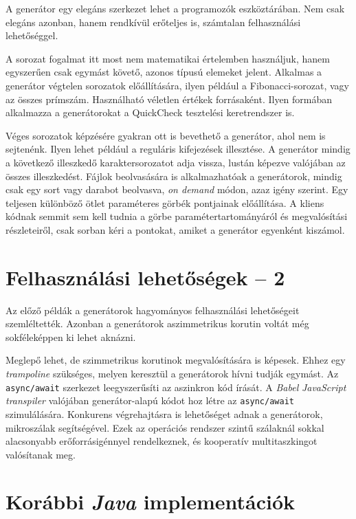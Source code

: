 \documentclass[12pt, a4paper]{article}
\begin{document}
A generátor egy elegáns szerkezet lehet a programozók eszköztárában. Nem csak elegáns azonban, hanem rendkívül erőteljes is, számtalan felhasználási lehetőséggel.

A sorozat fogalmat itt most nem matematikai értelemben használjuk, hanem egyszerűen csak egymást követő, azonos típusú elemeket jelent. Alkalmas a generátor végtelen sorozatok előállítására, ilyen például a Fibonacci-sorozat, vagy az összes prímszám. Használható véletlen értékek forrásaként. Ilyen formában alkalmazza a generátorokat a QuickCheck tesztelési keretrendszer is.

Véges sorozatok képzésére gyakran ott is bevethető a generátor, ahol nem is sejtenénk. Ilyen lehet például a reguláris kifejezések illesztése. A generátor mindig a következő illeszkedő karaktersorozatot adja vissza, lustán képezve valójában az összes illeszkedést. Fájlok beolvasására is alkalmazhatóak a generátorok, mindig csak egy sort vagy darabot beolvasva, \textit{on demand} módon, azaz igény szerint. Egy teljesen különböző ötlet paraméteres görbék pontjainak előállítása. A kliens kódnak semmit sem kell tudnia a görbe paramétertartományáról és megvalósítási részleteiről, csak sorban kéri a pontokat, amiket a generátor egyenként kiszámol.

\section{Felhasználási lehetőségek -- 2}

Az előző példák a generátorok hagyományos felhasználási lehetőségeit szemléltették. Azonban a generátorok aszimmetrikus korutin voltát még sokféleképpen ki lehet aknázni.

Meglepő lehet, de szimmetrikus korutinok megvalósítására is képesek. Ehhez egy \textit{trampoline} szükséges, melyen keresztül a generátorok hívni tudják egymást. Az \texttt{async/await} szerkezet leegyszerűsíti az aszinkron kód írását. A \textit{Babel} \textit{JavaScript} \textit{transpiler} valójában generátor-alapú kódot hoz létre az \texttt{async/await} szimulálására. Konkurens végrehajtásra is lehetőséget adnak a generátorok, mikroszálak segítségével. Ezek az operációs rendszer szintű szálaknál sokkal alacsonyabb erőforrásigénnyel rendelkeznek, és kooperatív multitaszkingot valósítanak meg.

\section{Korábbi \textit{Java} implementációk}
\end{document}
